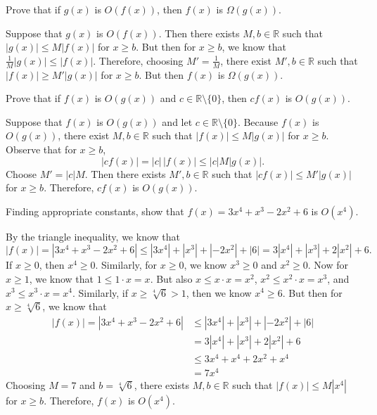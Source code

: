 \documentclass[11pt,letterpaper]{article}
\begin{document}

 Prove that if $g(x)$ is $O(f(x))$, then $f(x)$ is $\Omega(g(x))$. \pspace

\sol Suppose that $g(x)$ is $O(f(x))$. Then there exists $M, b \in \mathbb{R}$ such that $|g(x)| \leq M |f(x)|$ for $x \geq b$. But then for $x \geq b$, we know that $\frac{1}{M} |g(x)| \leq |f(x)|$. Therefore, choosing $M'= \frac{1}{M}$, there exist $M', b \in \mathbb{R}$ such that $|f(x)| \geq M' |g(x)|$ for $x \geq b$. But then $f(x)$ is $\Omega(g(x))$. 





\newpage





 Prove that if $f(x)$ is $O(g(x))$ and $c \in \mathbb{R} \setminus \{ 0 \}$, then $cf(x)$ is $O(g(x))$. \pspace

\sol Suppose that $f(x)$ is $O(g(x))$ and let $c \in \mathbb{R} \setminus \{ 0 \}$. Because $f(x)$ is $O(g(x))$, there exist $M, b \in \mathbb{R}$ such that $|f(x)| \leq M |g(x)|$ for $x \geq b$. Observe that for $x \geq b$,
	\[
	|cf(x)|= |c| \, |f(x)| \leq |c| M |g(x)|. 
	\]
Choose $M'= |c|M$. Then there exists $M', b \in \mathbb{R}$ such that $|cf(x)| \leq M' |g(x)|$ for $x \geq b$. Therefore, $cf(x)$ is $O(g(x))$. 





\newpage





 Finding appropriate constants, show that $f(x)= 3x^4 + x^3 - 2x^2 + 6$ is $O(x^4)$. \pspace

\sol By the triangle inequality, we know that
	\[
	|f(x)|= | 3x^4 + x^3 - 2x^2 + 6 | \leq |3x^4| + |x^3| + |-2x^2| + |6|= 3|x^4| + |x^3| + 2|x^2| + 6.
	\]
If $x \geq 0$, then $x^4 \geq 0$. Similarly, for $x \geq 0$, we know $x^3 \geq 0$ and $x^2 \geq 0$. Now for $x \geq 1$, we know that $1 \leq 1 \cdot x= x$. But also $x \leq x \cdot x= x^2$, $x^2 \leq x^2 \cdot x= x^3$, and $x^3 \leq x^3 \cdot x= x^4$. Similarly, if $x \geq \sqrt[4]{6} > 1$, then we know $x^4 \geq 6$. But then for $x \geq \sqrt[4]{6}$, we know that
	\[
	\begin{aligned}
	|f(x)|= | 3x^4 + x^3 - 2x^2 + 6 | &\leq |3x^4| + |x^3| + |-2x^2| + |6| \\[0.3cm]
	&= 3|x^4| + |x^3| + 2|x^2| + 6 \\[0.3cm]
	&\leq 3x^4 + x^4 + 2x^2 + x^4 \\[0.3cm]
	&= 7x^4
	\end{aligned}
	\]
Choosing $M= 7$ and $b= \sqrt[4]{6}$, there exists $M, b \in \mathbb{R}$ such that $|f(x)| \leq M |x^4|$ for $x \geq b$. Therefore, $f(x)$ is $O(x^4)$. 
\end{document}
